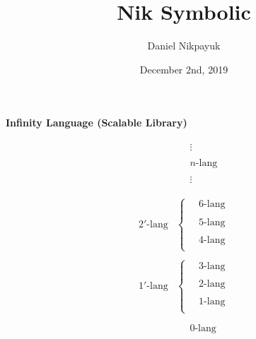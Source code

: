 \documentclass[twoside]{article}
\title{Nik Symbolic}
\author{Daniel Nikpayuk}
\date{December 2nd, 2019}
\begin{document}
\maketitle
\thispagestyle{empty}

\vspace{0.5cm}

\begin{center}
\bf Infinity Language (Scalable Library)
\end{center}

$$ \begin{array}{lr}
 & \quad\begin{array}{c}
 \vdots								\\
								\\
 n\mbox{-lang}							\\
								\\
 \vdots								\\
 \end{array}							\\
								\\
2'\mbox{-lang} & \left\{\quad\begin{array}{c}
 6\mbox{-lang}							\\
								\\
 5\mbox{-lang}							\\
								\\
 4\mbox{-lang}							\\
 \end{array}\right.						\\
								\\
1'\mbox{-lang} & \left\{\quad\begin{array}{c}
 3\mbox{-lang}							\\
								\\
 2\mbox{-lang}							\\
								\\
 1\mbox{-lang}							\\
 \end{array}\right.						\\
								\\
 & \quad\begin{array}{c}
 0\mbox{-lang}							\\
 \end{array}
\end{array} $$

\vspace{0.5cm}
\end{document}
